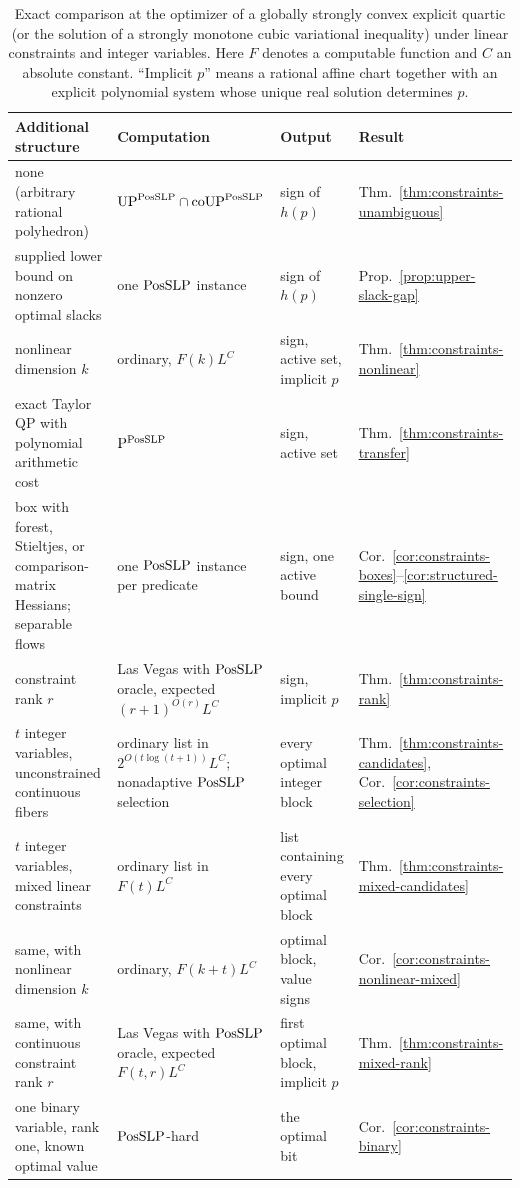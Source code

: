 \begin{table}[t]
\centering
\small
\begin{tabularx}{\textwidth}{@{}>{\raggedright\arraybackslash}X
  >{\raggedright\arraybackslash}p{3.9cm}
  >{\raggedright\arraybackslash}p{2.9cm}
  >{\raggedright\arraybackslash}p{2.1cm}@{}}
\toprule
Additional structure & Computation & Output & Result\\
\midrule
none (arbitrary rational polyhedron)
 & $\mathrm{UP}^{\mathrm{PosSLP}}\cap\mathrm{coUP}^{\mathrm{PosSLP}}$
 & sign of $h(p)$
 & Thm.~\ref{thm:constraints-unambiguous}\\
supplied lower bound on nonzero optimal slacks
 & one $\mathrm{PosSLP}$ instance
 & sign of $h(p)$
 & Prop.~\ref{prop:upper-slack-gap}\\
nonlinear dimension $k$
 & ordinary, $F(k)L^{C}$
 & sign, active set, implicit $p$
 & Thm.~\ref{thm:constraints-nonlinear}\\
exact Taylor QP with polynomial arithmetic cost
 & $\mathrm P^{\mathrm{PosSLP}}$
 & sign, active set
 & Thm.~\ref{thm:constraints-transfer}\\
box with forest, Stieltjes, or comparison-matrix Hessians; separable flows
 & one $\mathrm{PosSLP}$ instance per predicate
 & sign, one active bound
 & Cor.~\ref{cor:constraints-boxes}--\ref{cor:structured-single-sign}\\
constraint rank $r$
 & Las Vegas with $\mathrm{PosSLP}$ oracle, expected $(r+1)^{O(r)}L^{C}$
 & sign, implicit $p$
 & Thm.~\ref{thm:constraints-rank}\\
\midrule
$t$ integer variables, unconstrained continuous fibers
 & ordinary list in $2^{O(t\log(t+1))}L^{C}$; nonadaptive $\mathrm{PosSLP}$ selection
 & every optimal integer block
 & Thm.~\ref{thm:constraints-candidates}, Cor.~\ref{cor:constraints-selection}\\
$t$ integer variables, mixed linear constraints
 & ordinary list in $F(t)L^{C}$
 & list containing every optimal block
 & Thm.~\ref{thm:constraints-mixed-candidates}\\
same, with nonlinear dimension $k$
 & ordinary, $F(k+t)L^{C}$
 & optimal block, value signs
 & Cor.~\ref{cor:constraints-nonlinear-mixed}\\
same, with continuous constraint rank $r$
 & Las Vegas with $\mathrm{PosSLP}$ oracle, expected $F(t,r)L^{C}$
 & first optimal block, implicit $p$
 & Thm.~\ref{thm:constraints-mixed-rank}\\
one binary variable, rank one, known optimal value
 & $\mathrm{PosSLP}$-hard
 & the optimal bit
 & Cor.~\ref{cor:constraints-binary}\\
\bottomrule
\end{tabularx}
\caption{Exact comparison at the optimizer of a globally strongly convex
explicit quartic (or the solution of a strongly monotone cubic variational
inequality) under linear constraints and integer variables. Here $F$ denotes
a computable function and $C$ an absolute constant. ``Implicit $p$'' means a
rational affine chart together with an explicit polynomial system whose unique
real solution determines $p$.}
\label{tab:constraints-summary}
\end{table}

